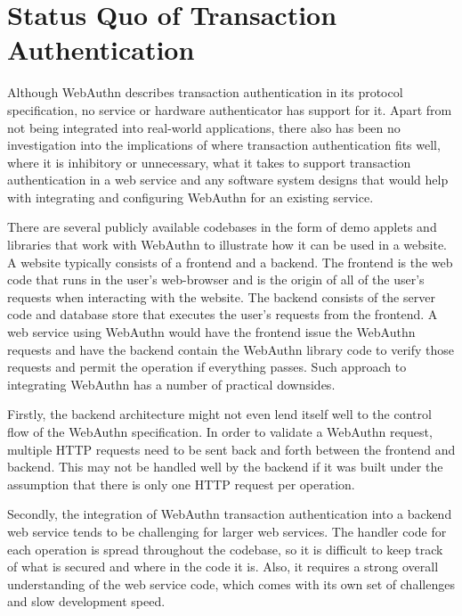 \section{Status Quo of Transaction Authentication}\label{Sec:StatusQuo}

Although WebAuthn describes transaction authentication in its protocol specification, no service or hardware authenticator has support for it. Apart from not being integrated into real-world applications, there also has been no investigation into the implications of where transaction authentication fits well, where it is inhibitory or unnecessary, what it takes to support transaction authentication in a web service and any software system designs that would help with integrating and configuring WebAuthn for an existing service.


There are several publicly available codebases in the form of demo applets and libraries that work with WebAuthn \cite{webauthn-online-examples} to illustrate how it can be used in a website. A website typically consists of a frontend and a backend. The frontend is the web code that runs in the user's web-browser and is the origin of all of the user's requests when interacting with the website. The backend consists of the server code and database store that executes the user's requests from the frontend. A web service using WebAuthn would have the frontend issue the WebAuthn requests and have the backend contain the WebAuthn library code to verify those requests and permit the operation if everything passes. Such approach to integrating WebAuthn has a number of practical downsides. 


Firstly, the backend architecture might not even lend itself well to the control flow of the WebAuthn specification. In order to validate a WebAuthn request, multiple HTTP requests need to be sent back and forth between the frontend and backend. This may not be handled well by the backend if it was built under the assumption that there is only one HTTP request per operation.

Secondly, the integration of WebAuthn transaction authentication into a backend web service tends to be challenging for larger web services. The handler code for each operation is spread throughout the codebase, so it is difficult to keep track of what is secured and where in the code it is. Also, it requires a strong overall understanding of the web service code, which comes with its own set of challenges and slow development speed.


